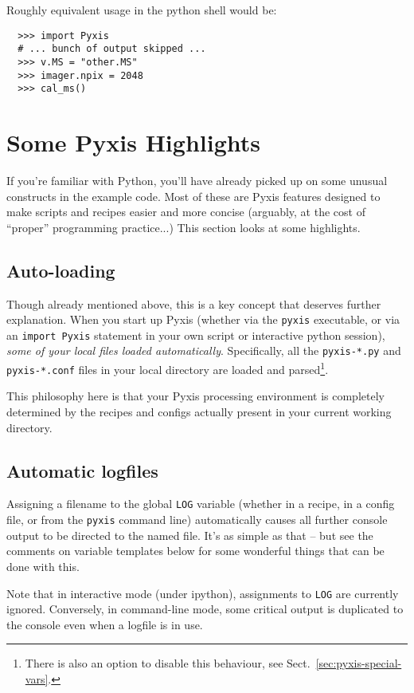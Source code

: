 \documentclass[a4paper,10pt]{article}
\begin{document}
Roughly equivalent usage in the python shell would be:

\begin{verbatim}
  >>> import Pyxis
  # ... bunch of output skipped ...
  >>> v.MS = "other.MS"
  >>> imager.npix = 2048
  >>> cal_ms()
\end{verbatim}

\section{Some Pyxis Highlights}

If you're familiar with Python, you'll have already picked up on some unusual constructs in the example code. 
Most of these are Pyxis features designed to make scripts and recipes easier and more concise (arguably, at the cost of 
``proper'' programming practice...) This section looks at some highlights. 

\subsection{Auto-loading}

Though already mentioned above, this is a key concept that deserves further explanation. When you start up Pyxis 
(whether via the {\tt pyxis} executable, or via an {\tt import Pyxis} statement in your own script or interactive python
session), {\em some of your local files loaded automatically}. Specifically, all the {\tt pyxis-*.py} and {\tt pyxis-*.conf}
files in your local directory are loaded and parsed\footnote{There is also an option to disable this behaviour, see Sect.~\ref{sec:pyxis-special-vars}.}. 

This philosophy here is that your Pyxis processing environment is completely determined by the recipes and configs actually
present in your current working directory. 

\subsection{Automatic logfiles}

Assigning a filename to the global {\tt LOG} variable (whether in a recipe, in a config file, or from the {\tt pyxis} command line) 
automatically causes all further console output to be directed to the named file. It's as simple as that -- but see the comments on 
variable templates below for some wonderful things that can be done with this.

Note that in interactive mode (under ipython), assignments to {\tt LOG} are currently ignored. Conversely, in 
command-line mode, some critical output is duplicated to the console even when a logfile is in use.
\end{document}
